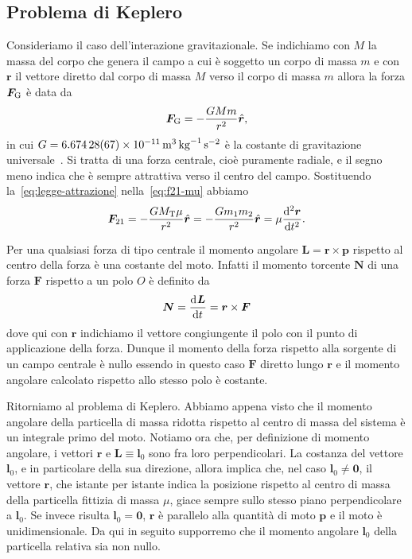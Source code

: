 \subsection{Problema di Keplero}
\label{sec:problema-keplero}

Consideriamo il caso dell'interazione gravitazionale. Se indichiamo con $M$ la
massa del corpo che genera il campo a cui è soggetto un corpo di massa $m$ e con
$\bm{r}$ il vettore diretto dal corpo di massa $M$ verso il corpo di massa $m$
allora la forza $\bm{F}_\textup{G}$ è data da
\begin{equation}
  \label{eq:legge-attrazione}
  \bm{F}_\textup{G} = -\frac{GMm}{r^2}\versor{r},
\end{equation}
in cui $G=\SI{6.674
  28(67)e-11}{\metre\tothe{3}\per\kilogram\per\second\squared}$ è la costante di
gravitazione universale~\cite{codata:costanti}. Si tratta di una forza centrale,
cioè puramente radiale, e il segno meno indica che è sempre attrattiva verso il
centro del campo. Sostituendo la~\eqref{eq:legge-attrazione}
nella~\eqref{eq:f21-mu} abbiamo
\begin{equation}
  \label{eq:forza-mu}
  \bm{F}_{21} = -\frac{GM_\textup{T}\mu}{r^2}\versor{r} =
  -\frac{Gm_1m_2}{r^2}\versor{r} = \mu\toder[2]{\bm{r}}{t}.
\end{equation}

Per una qualsiasi forza di tipo centrale il momento angolare
$\bm{L}=\bm{r}\times\bm{p}$ rispetto al centro della forza è una costante del
moto. Infatti il momento torcente $\bm{N}$ di una forza $\bm{F}$ rispetto a un
polo $O$ è definito da
\begin{equation}
  \bm{N}= \frac{{\mathop{}\!\mathrm{d}^{}}\bm{L}}{\mathop{}\!\mathrm{d} {t}^{}} = \bm{r}\times\bm{F}
\end{equation}
dove qui con $\bm{r}$ indichiamo il vettore congiungente il polo con il punto di
applicazione della forza. Dunque il momento della forza rispetto alla sorgente
di un campo centrale è nullo essendo in questo caso $\bm{F}$ diretto lungo
$\bm{r}$ e il momento angolare calcolato rispetto allo stesso polo è
costante.

Ritorniamo al problema di Keplero. Abbiamo appena visto che il momento angolare
della particella di massa ridotta rispetto al centro di massa del sistema è un
integrale primo del moto. Notiamo ora che, per definizione di momento angolare,
i vettori $\bm{r}$ e $\bm{L}\equiv\bm{l}_0$ sono fra loro perpendicolari. La
costanza del vettore $\bm{l}_0$, e in particolare della sua direzione, allora
implica che, nel caso $\bm{l}_0\neq\bm{0}$, il vettore $\bm{r}$, che istante per
istante indica la posizione rispetto al centro di massa della particella
fittizia di massa $\mu$, giace sempre sullo stesso piano perpendicolare a
$\bm{l}_0$. Se invece risulta $\bm{l}_0=\bm{0}$, $\bm{r}$ è parallelo alla
quantità di moto $\bm{p}$ e il moto è unidimensionale. Da qui in seguito
supporremo che il momento angolare $\bm{l}_0$ della particella relativa sia non
nullo.


